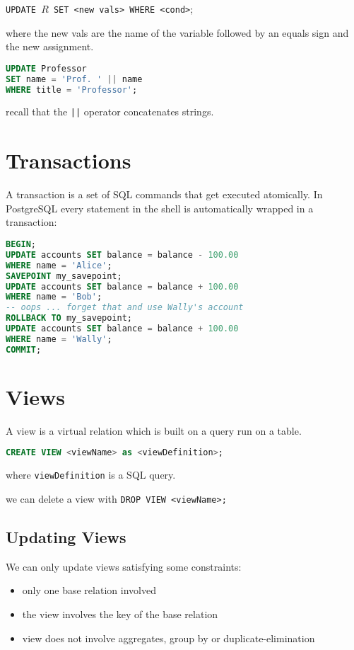 \documentclass{sciposter}
\renewcommand{\t}[1]{\texttt{#1}}
\begin{document}
\begin{multicols}{3}
\texttt{UPDATE $R$ SET <new vals> WHERE <cond>};

where the new vals are the name of the variable followed by an equals sign and the new assignment. 
\begin{lstlisting}[language=SQL]
UPDATE Professor
SET name = 'Prof. ' || name
WHERE title = 'Professor';
\end{lstlisting}
recall that the \t{||} operator concatenates strings.


\section*{Transactions}


A transaction is a set of SQL commands that get executed atomically. In PostgreSQL every statement in the shell is automatically wrapped in a transaction:

\begin{lstlisting}[language=SQL]
BEGIN;
UPDATE accounts SET balance = balance - 100.00
WHERE name = 'Alice';
SAVEPOINT my_savepoint;
UPDATE accounts SET balance = balance + 100.00
WHERE name = 'Bob';
-- oops ... forget that and use Wally's account
ROLLBACK TO my_savepoint;
UPDATE accounts SET balance = balance + 100.00
WHERE name = 'Wally';
COMMIT;

\end{lstlisting}


\section*{Views}

A view is a virtual relation which is built on a query run on a table. 
\begin{lstlisting}[language=SQL]
CREATE VIEW <viewName> as <viewDefinition>;
\end{lstlisting}
where \t{viewDefinition} is a SQL query.

we can delete a view with \t{DROP VIEW <viewName>;}

\subsection*{Updating Views}

We can only update views satisfying some constraints:
\begin{itemize}
	\item only one base relation involved
	\item the view involves the key of the base relation
	\item view does not involve aggregates, group by or duplicate-elimination
\end{itemize}



\end{multicols}
\end{document}
